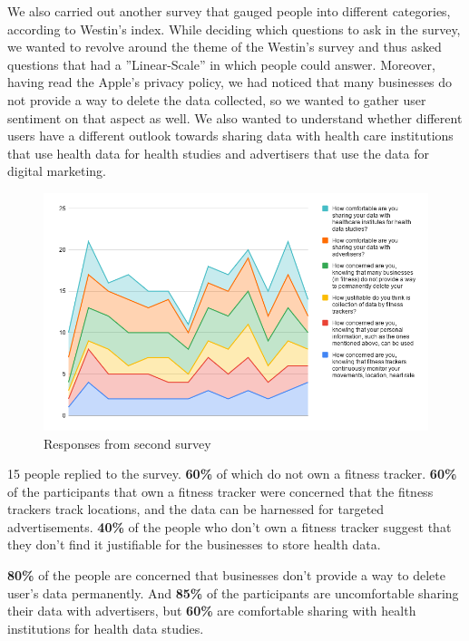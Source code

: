 \documentclass[sigconf]{acmart}
\begin{document}
We also carried out another survey that gauged people into different categories, according to Westin’s index. While deciding which questions to ask in the survey, we wanted to revolve around the theme of the Westin’s survey and thus asked questions that had a ”Linear-Scale” in which people could answer. Moreover, having read the Apple’s privacy policy, we had noticed that many businesses do not provide a way to delete the data collected, so we wanted to gather user sentiment on that aspect as well. We also wanted to understand whether different users have a different outlook towards sharing data with health care institutions that use health data for health studies and advertisers that use the data for digital marketing.

\begin{figure}[h]
  \centering
  \includegraphics[width=\linewidth]{07-chart2.png}
  \caption{Responses from second survey}
  \label{fig:responses}
\end{figure}


15 people replied to the survey. \textbf{60\%} of which do not own a fitness tracker. \textbf{60\%} of the participants that own a fitness tracker were concerned that the fitness trackers track locations, and the data can be harnessed for targeted advertisements. \textbf{40\%} of the people who don’t own a fitness tracker suggest that they don’t find it justifiable for the businesses to store health data.

\textbf{80\%} of the people are concerned that businesses don’t provide a way to delete user’s data permanently. And \textbf{85\%} of the participants are uncomfortable sharing their data with advertisers, but \textbf{60\%} are comfortable sharing with health institutions for health data studies.
\end{document}
